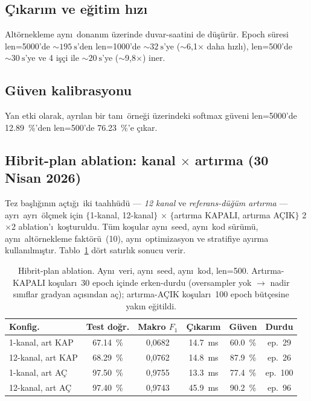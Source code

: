 \documentclass[conference]{IEEEtran}
\begin{document}
\subsection{\c{C}\i kar\i m ve e\u{g}itim h\i z\i}
Alt\"{o}rnekleme ayn\i\ donan\i m \"{u}zerinde duvar-saatini de
d\"{u}\c{s}\"{u}r\"{u}r. Epoch s\"{u}resi len=\num{5000}'de
$\sim\SI{195}{\second}$'den len=\num{1000}'de $\sim\SI{32}{\second}$'ye
($\sim$6,1$\times$ daha h\i zl\i), len=\num{500}'de
$\sim\SI{30}{\second}$'ye ve \num{4} i\c{s}\c{c}i ile
$\sim\SI{20}{\second}$'ye ($\sim$9,8$\times$) iner.

\subsection{G\"{u}ven kalibrasyonu}
Yan etki olarak, ayr\i lan bir tan\i\ \"{o}rne\u{g}i \"{u}zerindeki softmax
g\"{u}veni len=\num{5000}'de \SI{12,89}{\percent}'den len=\num{500}'de
\SI{76,23}{\percent}'e \c{c}\i kar.

\subsection{Hibrit-plan ablation: kanal $\times$ artırma
            (\num{30} Nisan \num{2026})}
\label{sec:hybrid}
Tez ba\c{s}l\i \u{g}\i n\i n a\c{c}t\i\u{g}\i\ iki taahh\"{u}d\"{u} —
\emph{12 kanal} ve \emph{referans-d\"{u}\u{g}\"{u}m artırma} — ayr\i\ ayr\i\
\"{o}l\c{c}mek i\c{c}in $\{$1-kanal, 12-kanal$\}$ $\times$ $\{$artırma KAPALI,
artırma A\c{C}IK$\}$ 2$\times$2 ablation'\i\ ko\c{s}turuldu. T\"{u}m
ko\c{s}ular ayn\i\ seed, ayn\i\ kod s\"{u}r\"{u}m\"{u}, ayn\i\ alt\"{o}rnekleme
fakt\"{o}r\"{u}\ (10), ayn\i\ optimizasyon ve stratifiye ay\i rma
kullan\i lm\i\c{s}t\i r. Tablo~\ref{tab:hybrid} d\"{o}rt sat\i rl\i k sonucu verir.

\begin{table}[t]
\caption{Hibrit-plan ablation. Ayn\i\ veri, ayn\i\ seed, ayn\i\ kod,
         len=\num{500}. Artırma-KAPALI ko\c{s}ular\i\ 30 epoch i\c{c}inde
         erken-durdu (oversampler yok $\rightarrow$ nadir s\i n\i flar
         gradyan a\c{c}\i s\i ndan a\c{c}); artırma-A\c{C}IK ko\c{s}ular\i\
         100 epoch b\"{u}t\c{c}esine yak\i n e\u{g}itildi.}
\label{tab:hybrid}
\centering
\small
\begin{tabular}{@{}lccccc@{}}
\toprule
Konfig. & Test do\u{g}r. & Makro $F_1$ & \c{C}\i kar\i m & G\"{u}ven & Durdu \\
\midrule
1-kanal, art KAP  & \SI{67,14}{\percent} & 0,0682 & \SI{14,7}{\milli\second} & \SI{60,0}{\percent} & ep.\ 29 \\
12-kanal, art KAP & \SI{68,29}{\percent} & 0,0762 & \SI{14,8}{\milli\second} & \SI{87,9}{\percent} & ep.\ 26 \\
1-kanal, art A\c{C}   & \SI{97,50}{\percent} & 0,9755 & \SI{13,3}{\milli\second} & \SI{77,4}{\percent} & ep.\ 100 \\
12-kanal, art A\c{C}  & \SI{97,40}{\percent} & 0,9743 & \SI{45,9}{\milli\second} & \SI{90,2}{\percent} & ep.\ 96 \\
\bottomrule
\end{tabular}
\end{table}
\end{document}
